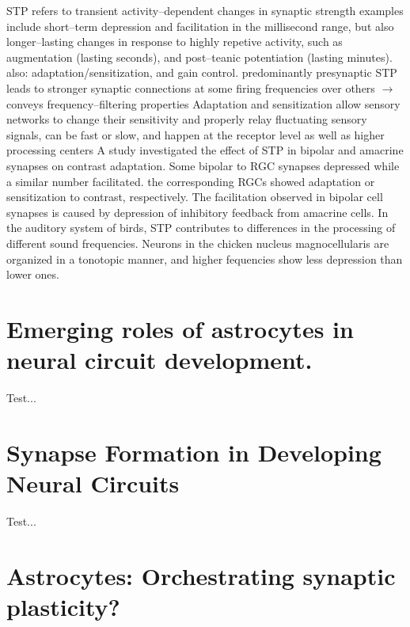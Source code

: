 \documentclass[11pt, a4paper, oneside]{article}   	%
\begin{document}
\begin{outline}
    \point STP refers to transient activity--dependent changes in synaptic strength
        \subpoint examples include short--term depression and facilitation in the millisecond range, but also longer--lasting changes in response to highly repetive activity, such as augmentation (lasting seconds), and post--teanic potentiation (lasting minutes).
        \subpoint also: adaptation/sensitization, and gain control.
    \point predominantly presynaptic
        \subpoint STP leads to stronger synaptic connections at some firing frequencies over others $\rightarrow$ conveys frequency--filtering properties
    \point Adaptation and sensitization allow sensory networks to change their sensitivity and properly relay fluctuating sensory signals, can be fast or slow, and happen at the receptor level as well as higher processing centers
        \subpoint A study investigated the effect of STP in bipolar and amacrine synapses on contrast adaptation. Some bipolar to RGC synapses depressed while a similar number facilitated. the corresponding RGCs showed adaptation or sensitization to contrast, respectively. The facilitation observed in bipolar cell synapses is caused by depression of inhibitory feedback from amacrine cells. 
    \point In the auditory system of birds, STP contributes to differences in the processing of different sound frequencies. Neurons in the chicken nucleus magnocellularis are organized in a tonotopic manner, and higher fequencies show less depression than lower ones. 
  
\end{outline}











\section{Emerging roles of astrocytes in neural circuit development. \cite{Clarke2013}}

Test...

\section{Synapse Formation in Developing Neural Circuits \cite{Colon-Ramos2009}}

Test...

\section{Astrocytes: Orchestrating synaptic plasticity? \cite{DePitta2016}}
\end{document}

